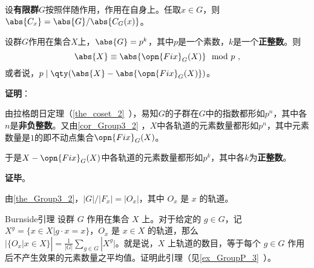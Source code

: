 \begin{corollary}{}\label{cor_Group3_3}

设\textbf{有限群}$G$按照伴随作用，作用在自身上。任取$x\in G$，则$\abs{C_x}=\abs{G}/\abs{C_G(x)}$。

\end{corollary}




\begin{theorem}{}\label{the_Group3_5}
设群$G$作用在集合$X$上，$\abs{G}=p^k$，其中$p$是一个素数，$k$是一个\textbf{正整数}。则
\begin{equation}
\abs{X} \equiv \abs{\opn{Fix}_G(X)} \mod  p~,
\end{equation}
或者说，$p\mid \qty(\abs{X}-\abs{\opn{Fix}_G(X)})$。
\end{theorem}

\textbf{证明}：

由拉格朗日定理（\autoref{the_coset_2}~），易知$G$的子群在$G$中的指数都形如$p^n$，其中各$n$是\textbf{非负整数}。又由\autoref{cor_Group3_2} ，$X$中各轨道的元素数量都形如$p^n$，其中元素数量是$1$的即不动点集合$\opn{Fix}_G(X)$。

于是$X-\opn{Fix}_G(X)$中各轨道的元素数量都形如$p^k$，其中各$k$为\textbf{正整数}。

\textbf{证毕}。









\begin{corollary}{}\label{cor_Group3_1}
由\autoref{the_Group3_2}，$|G|/|F_x|=|O_x|$，其中 $O_x$ 是 $x$ 的轨道。
\end{corollary}

\begin{exercise}{Burnside引理}\label{exe_Group3_2}
设群 $G$ 作用在集合 $X$ 上。对于给定的 $g\in G$，记 $X^g=\{x\in X|g\cdot x=x\}$，$O_x$ 是 $x\in X$ 的轨道，那么 $|\{O_x|x\in X\}|=\frac{1}{|G|}\sum_{g\in G}|X^g|$。就是说，$X$ 上轨道的数目，等于每个 $g\in G$ 作用后不产生效果的元素数量之平均值。证明此引理（见\autoref{ex_GroupP_3}~）。
\end{exercise}

